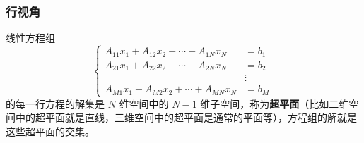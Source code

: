 \subsubsection{行视角}

线性方程组
\begin{equation}
\begin{cases}
A_{11} x_1 + A_{12} x_2 + \cdots + A_{1N} x_N &= b_1 \\
A_{21} x_1 + A_{22} x_2 + \cdots + A_{2N} x_N &= b_2 \\
&\vdots \\
A_{M1} x_1 + A_{M2} x_2 + \cdots + A_{MN} x_N &= b_M
\end{cases} ~
\end{equation}
的每一行方程的解集是 $N$ 维空间中的 $N-1$ 维子空间，称为\textbf{超平面}（比如二维空间中的超平面就是直线，三维空间中的超平面是通常的平面等），方程组的解就是这些超平面的交集。

